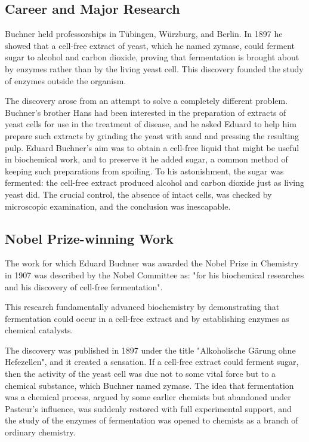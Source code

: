 \subsection*{Career and Major Research}

Buchner held professorships in Tübingen, Würzburg, and Berlin. In 1897 he showed that a cell-free extract of yeast, which he named zymase, could ferment sugar to alcohol and carbon dioxide, proving that fermentation is brought about by enzymes rather than by the living yeast cell. This discovery founded the study of enzymes outside the organism.

The discovery arose from an attempt to solve a completely different problem. Buchner's brother Hans had been interested in the preparation of extracts of yeast cells for use in the treatment of disease, and he asked Eduard to help him prepare such extracts by grinding the yeast with sand and pressing the resulting pulp. Eduard Buchner's aim was to obtain a cell-free liquid that might be useful in biochemical work, and to preserve it he added sugar, a common method of keeping such preparations from spoiling. To his astonishment, the sugar was fermented: the cell-free extract produced alcohol and carbon dioxide just as living yeast did. The crucial control, the absence of intact cells, was checked by microscopic examination, and the conclusion was inescapable.

\subsection*{Nobel Prize-winning Work}

The work for which Eduard Buchner was awarded the Nobel Prize in Chemistry in 1907 was described by the Nobel Committee as: "for his biochemical researches and his discovery of cell-free fermentation".

This research fundamentally advanced biochemistry by demonstrating that fermentation could occur in a cell-free extract and by establishing enzymes as chemical catalysts.

The discovery was published in 1897 under the title "Alkoholische Gärung ohne Hefezellen", and it created a sensation. If a cell-free extract could ferment sugar, then the activity of the yeast cell was due not to some vital force but to a chemical substance, which Buchner named zymase. The idea that fermentation was a chemical process, argued by some earlier chemists but abandoned under Pasteur's influence, was suddenly restored with full experimental support, and the study of the enzymes of fermentation was opened to chemists as a branch of ordinary chemistry.

